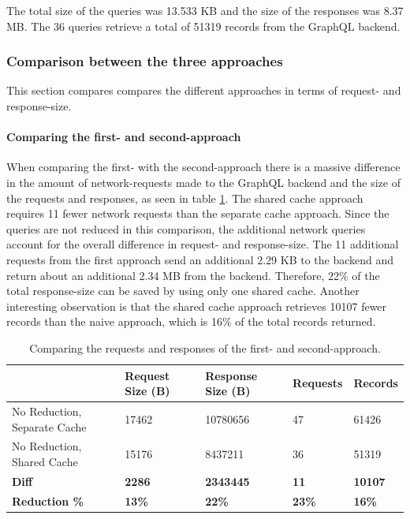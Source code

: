 The total size of the queries was 13.533 KB and the size of the responses was 8.37 MB. The 36 queries retrieve a total of 51319 records from the GraphQL backend.

\subsubsection{Comparison between the three approaches}

This section compares compares the different approaches in terms of request- and response-size.

\paragraph{Comparing the first- and second-approach}

When comparing the first- with the second-approach there is a massive difference in the amount of network-requests made to the GraphQL backend and the size of the requests and responses, as seen in table \ref{table:results:size-comparison-first-path-no-cache-no-reduction-cache-no-reduction}. The shared cache approach requires 11 fewer network requests than the separate cache approach. Since the queries are not reduced in this comparison, the additional network queries account for the overall difference in request- and response-size. The 11 additional requests from the first approach send an additional 2.29 KB to the backend and return about an additional 2.34 MB from the backend. Therefore, 22\% of the total response-size can be saved by using only one shared cache. Another interesting observation is that the shared cache approach retrieves 10107 fewer records than the naive approach, which is 16\% of the total records returned.

\ifshowTables
\begin{table}[H]
    \begin{tabular}{|l|l|l|l|l|}
    \hline
      & Request Size (B) & Response Size (B) & Requests & Records \\
    \hline
     No Reduction, Separate Cache & 17462 & 10780656 & 47 & 61426 \\
     \hline
     No Reduction, Shared Cache & 15176 & 8437211 & 36 & 51319 \\
     \hline
     \hline
     \textbf{Diff} & \textbf{2286} & \textbf{2343445} & \textbf{11} & \textbf{10107} \\
     \hline
     \textbf{Reduction \%} & \textbf{13\%} & \textbf{22\%} & \textbf{23\%} & \textbf{16\%} \\
     \hline
    \end{tabular}
    \caption{Comparing the requests and responses of the first- and second-approach.}
    \label{table:results:size-comparison-first-path-no-cache-no-reduction-cache-no-reduction}
\end{table}
\fi

